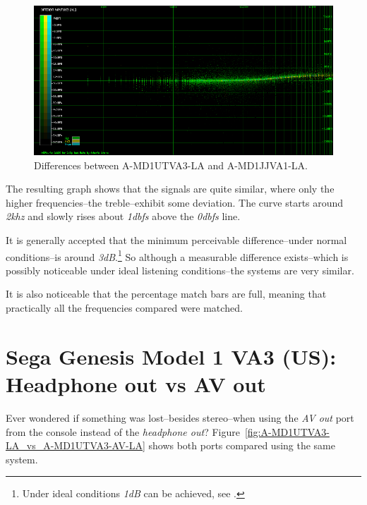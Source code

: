 \documentclass[10pt,a4paper]{report}
\newcommand{\khz}[1]{\textit{\mbox{#1\acrshort{khz}}}}
\newcommand{\db}[1]{\textit{\mbox{#1\acrshort{dbfs}}}}
\begin{document}
\begin{figure}[H]
	\centering
	\includegraphics[width=1.0\linewidth]{images/results/1-A-MD1UTVA3-LA_vs_A-MD1JJVA1-LA.png}
	\caption[A-MD1UTVA3-LA vs A-MD1JJVA1-LA]{Differences between A-MD1UTVA3-LA and A-MD1JJVA1-LA.}
	\label{fig:A-MD1UTVA3-LA_vs_A-MD1JJVA1-LA}
\end{figure}

The resulting graph shows that the signals are quite similar, where only the higher frequencies--the treble--exhibit some deviation. The curve starts around \khz{2} and slowly rises about \db{1} above the \db{0} line.

It is generally accepted that the minimum perceivable difference--under normal conditions--is around \textit{3dB}.\footnote{Under ideal conditions \textit{1dB} can be achieved, see \cite{dbdiff}.} So although a measurable difference exists--which is possibly noticeable under ideal listening conditions--the systems are very similar.

It is also noticeable that the percentage match bars are full, meaning that practically all the frequencies compared were matched.

\section{Sega Genesis Model 1 VA3 (US):\\ Headphone out vs AV out}

Ever wondered if something was lost--besides stereo--when using the \textit{AV out} port from the console instead of the \textit{headphone out}? Figure~\ref{fig:A-MD1UTVA3-LA_vs_A-MD1UTVA3-AV-LA} shows both ports compared using the same system.
\end{document}
